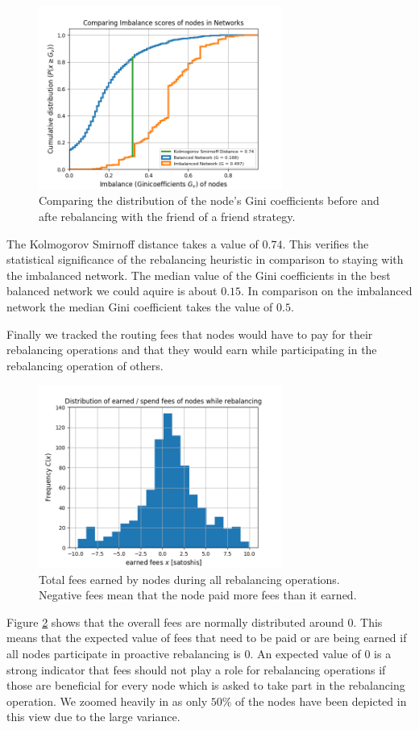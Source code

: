 \documentclass[a4paper]{paper}
\begin{document}
\begin{figure}
 \centering
 \includegraphics[width=8cm]{code/vs/fig/comparison distribution of Ginicoefficients.png}
 \caption{Comparing the distribution of the node's Gini coefficients before and afte rebalancing with the friend of a friend strategy.}
 \label{fig:cdf_gini}
 \end{figure}
 The Kolmogorov Smirnoff distance takes a value of $0.74$.
 This verifies the statistical significance of the rebalancing heuristic in comparison to staying with the imbalanced network.
The median value of the Gini coefficients in the best balanced network we could aquire is about $0.15$.
 In comparison on the imbalanced network the median Gini coefficient takes the value of $0.5$.

Finally we tracked the routing fees that nodes would have to pay for their rebalancing operations and that they would earn while participating in the rebalancing operation of others.
 \begin{figure}
 \centering
 \includegraphics[width=8cm]{code/vs/fig/distribution_of_fees.png}
 \caption{Total fees earned by nodes during all rebalancing operations. Negative fees mean that the node paid more fees than it earned.}
 \label{fig:fees}
 \end{figure}
 Figure \cref{fig:fees} shows that the overall fees are normally distributed around $0$.
 This means that the expected value of fees that need to be paid or are being earned if all nodes participate in proactive rebalancing is $0$.
An expected value of $0$ is a strong indicator that fees should not play a role for rebalancing operations if those are beneficial for every node which is asked to take part in the rebalancing operation.
 We zoomed heavily in as only $50\%$ of the nodes have been depicted in this view due to the large variance.
\end{document}
